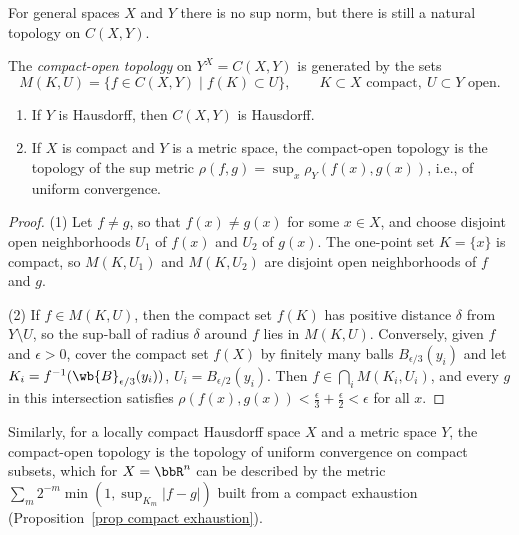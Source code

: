 For general spaces $X$ and $Y$ there is no sup norm, but there is still a natural topology on $C(X,Y)$.

\begin{defn}\label{defn compact-open}
    The \emph{compact-open topology} on $Y^X=C(X,Y)$ is generated by the sets
    \[M(K,U)=\{f\in C(X,Y)\mid f(K)\subset U\},\qquad K\subset X\text{ compact},\ U\subset Y\text{ open}.\]
\end{defn}

\begin{prop}\label{prop compact-open}
    \begin{enumerate}
        \item If $Y$ is Hausdorff, then $C(X,Y)$ is Hausdorff.
        \item If $X$ is compact and $Y$ is a metric space, the compact-open topology is the topology of the sup metric $\rho(f,g)=\sup_x\rho_Y(f(x),g(x))$, i.e., of uniform convergence.
    \end{enumerate}
\end{prop}
\begin{proof}
    (1) Let $f\neq g$, so that $f(x)\neq g(x)$ for some $x\in X$, and choose disjoint open neighborhoods $U_1$ of $f(x)$ and $U_2$ of $g(x)$. The one-point set $K=\{x\}$ is compact, so $M(K,U_1)$ and $M(K,U_2)$ are disjoint open neighborhoods of $f$ and $g$.

    (2) If $f\in M(K,U)$, then the compact set $f(K)$ has positive distance $\delta$ from $Y\setminus U$, so the sup-ball of radius $\delta$ around $f$ lies in $M(K,U)$. Conversely, given $f$ and $\epsilon>0$, cover the compact set $f(X)$ by finitely many balls $B_{\epsilon/3}(y_i)$ and let $K_i=f^{-1}(\wb{B}_{\epsilon/3}(y_i))$, $U_i=B_{\epsilon/2}(y_i)$. Then $f\in\bigcap_iM(K_i,U_i)$, and every $g$ in this intersection satisfies $\rho(f(x),g(x))<\frac{\epsilon}{3}+\frac{\epsilon}{2}<\epsilon$ for all $x$.
\end{proof}

Similarly, for a locally compact Hausdorff space $X$ and a metric space $Y$, the compact-open topology is the topology of uniform convergence on compact subsets, which for $X=\bbR^n$ can be described by the metric $\sum_m2^{-m}\min(1,\sup_{K_m}\lvert f-g\rvert)$ built from a compact exhaustion (Proposition~\ref{prop compact exhaustion}).

